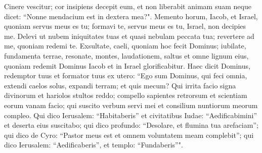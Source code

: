 \begin{biblechapter}
\verse Cinere vescitur; cor insipiens decepit eum, et non liberabit animam suam neque dicet: “Nonne mendacium est in dextera mea?". 
\verse Memento horum, Iacob, et Israel, quoniam servus meus es tu; formavi te, servus meus es tu, Israel, non decipies me. 
\verse Delevi ut nubem iniquitates tuas et quasi nebulam peccata tua; revertere ad me, quoniam redemi te. 
\verse Exsultate, caeli, quoniam hoc fecit Dominus; iubilate, fundamenta terrae, resonate, montes, laudationem, saltus et omne lignum eius, quoniam redemit Dominus Iacob et in Israel glorificabitur. 
\verse Haec dicit Dominus, redemptor tuus et formator tuus ex utero: “Ego sum Dominus, qui feci omnia, extendi caelos solus, expandi terram; et quis mecum? 
\verse Qui irrita facio signa divinorum et hariolos stultos reddo; compello sapientes retrorsum et scientiam eorum vanam facio; 
\verse qui suscito verbum servi mei et consilium nuntiorum meorum compleo. Qui dico Ierusalem: “Habitaberis” et civitatibus Iudae: “Aedificabimini” et deserta eius suscitabo; 
\verse qui dico profundo: “Desolare, et flumina tua arefaciam”; 
\verse qui dico de Cyro: “Pastor meus est et omnem voluntatem meam complebit”; qui dico Ierusalem: “Aedificaberis”, et templo: “Fundaberis”". 
\end{biblechapter}

